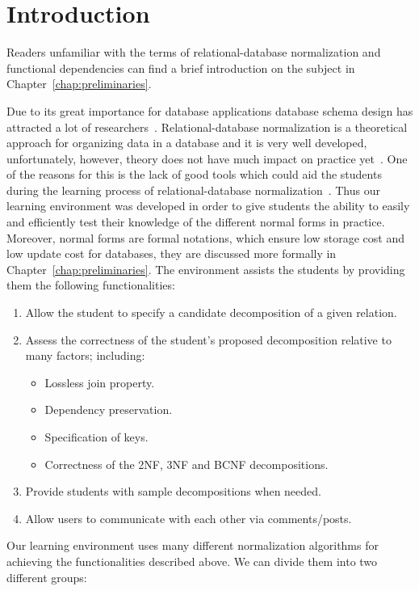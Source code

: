 \chapter{Introduction}
\label{chap:introduction}
Readers unfamiliar with the terms of relational-database normalization and 
functional dependencies can find a brief introduction on the subject in
Chapter~\ref{chap:preliminaries}. 

Due to its great importance for database applications database schema design has
attracted a lot of researchers~\cite{p1}. Relational-database normalization is a 
theoretical approach for organizing data in a database and it is very well developed, 
unfortunately, however, theory does not have much impact on practice yet~\cite{p1}.
One of the reasons for this is the lack of good tools which could aid the students 
during the learning process of relational-database normalization~\cite{p8}. 
Thus our learning environment was developed in order to give students the ability to 
easily and efficiently test
their knowledge of the different normal forms in practice. Moreover, normal forms are formal
notations, which ensure low storage cost and low update cost for databases, they are discussed
more formally in Chapter~\ref{chap:preliminaries}. The environment assists the students by 
providing them the following functionalities:

\begin{enumerate}
	\item Allow the student to specify a candidate decomposition of a given relation.
	\item Assess the correctness of the student's proposed decomposition relative to many factors; including:
		\begin{itemize}
			\item Lossless join property.
			\item Dependency preservation.
			\item Specification of keys.
			\item Correctness of the 2NF, 3NF and BCNF decompositions.
		\end{itemize}
	\item Provide students with sample decompositions when needed. 
	\item Allow users to communicate with each other via comments/posts.
\end{enumerate}

Our learning environment uses many different normalization 
algorithms for achieving the functionalities described above. 
We can divide them into two different groups:

